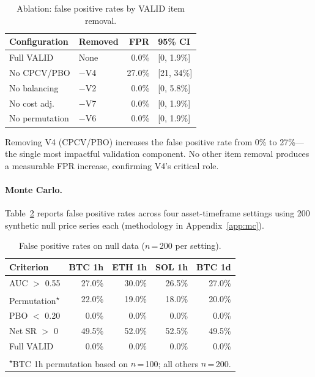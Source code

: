 \documentclass[sigconf,anonymous,review]{acmart}
\begin{document}
\begin{table}[t]
\centering
\caption{Ablation: false positive rates by VALID item removal.}
\label{tab:ablation}
\small
\begin{tabular}{llrl}
\toprule
Configuration & Removed & FPR & 95\% CI \\
\midrule
Full VALID & None & 0.0\% & [0, 1.9\%] \\
No CPCV/PBO & $-$V4 & 27.0\% & [21, 34\%] \\
No balancing & $-$V2 & 0.0\% & [0, 5.8\%] \\
No cost adj. & $-$V7 & 0.0\% & [0, 1.9\%] \\
No permutation & $-$V6 & 0.0\% & [0, 1.9\%] \\
\bottomrule
\end{tabular}
\end{table}

Removing V4 (CPCV/PBO) increases the false positive rate from 0\% to
27\%---the single most impactful validation component. No other item
removal produces a measurable FPR increase, confirming V4's critical
role.

\paragraph{Monte Carlo.}
Table~\ref{tab:fpr} reports false positive rates across four
asset-timeframe settings using 200 synthetic null price series each
(methodology in Appendix~\ref{app:mc}).

\begin{table}[t]
\centering
\caption{False positive rates on null data ($n$\,=\,200 per setting).}
\label{tab:fpr}
\small
\begin{tabular}{lrrrr}
\toprule
Criterion & BTC 1h & ETH 1h & SOL 1h & BTC 1d \\
\midrule
AUC $>$ 0.55 & 27.0\% & 30.0\% & 26.5\% & 27.0\% \\
Permutation\textsuperscript{$\star$} & 22.0\% & 19.0\% & 18.0\% & 20.0\% \\
PBO $<$ 0.20 & 0.0\% & 0.0\% & 0.0\% & 0.0\% \\
Net SR $>$ 0 & 49.5\% & 52.0\% & 52.5\% & 49.5\% \\
Full VALID & 0.0\% & 0.0\% & 0.0\% & 0.0\% \\
\bottomrule
\multicolumn{5}{l}{\footnotesize \textsuperscript{$\star$}BTC 1h
permutation based on $n$\,=\,100; all others $n$\,=\,200.}
\end{tabular}
\end{table}
\end{document}
